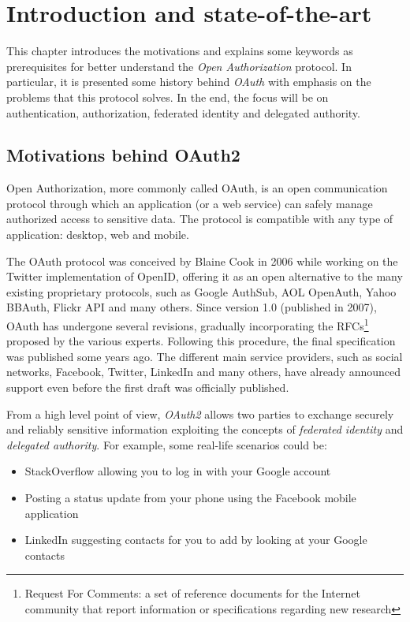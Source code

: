 \chapter{Introduction and state-of-the-art}
\minitoc

This chapter introduces the motivations and explains some keywords as prerequisites for better understand the \textit{Open Authorization} protocol. In particular, it is presented some history behind \textit{OAuth} with emphasis on the problems that this protocol solves. In the end, the focus will be on authentication, authorization, federated identity and delegated authority.

\section{Motivations behind OAuth2}
Open Authorization, more commonly called OAuth, is an open communication protocol through which an application (or a web service) can safely manage authorized access to sensitive data. The protocol is compatible with any type of application: desktop, web and mobile.

The OAuth protocol was conceived by Blaine Cook in 2006 while working on the Twitter implementation of OpenID, offering it as an open alternative to the many existing proprietary protocols, such as Google AuthSub, AOL OpenAuth, Yahoo BBAuth, Flickr API and many others. Since version 1.0 (published in 2007), OAuth has undergone several revisions, gradually incorporating the RFCs\footnote{Request For Comments: a set of reference documents for the Internet community that report information or specifications regarding new research} proposed by the various experts. Following this procedure, the final specification was published some years ago. The different main service providers, such as social networks, Facebook, Twitter, LinkedIn and many others, have already announced support even before the first draft was officially published.

From a high level point of view, \textit{OAuth2} allows two parties to exchange securely and reliably sensitive information exploiting the concepts of \textit{federated identity} and \textit{delegated authority}. For example, some real-life scenarios could be:

\begin{itemize}
    \item StackOverflow allowing you to log in with your Google account
    \item Posting a status update from your phone using the Facebook mobile application
    \item LinkedIn suggesting contacts for you to add by looking at your Google contacts
\end{itemize}

